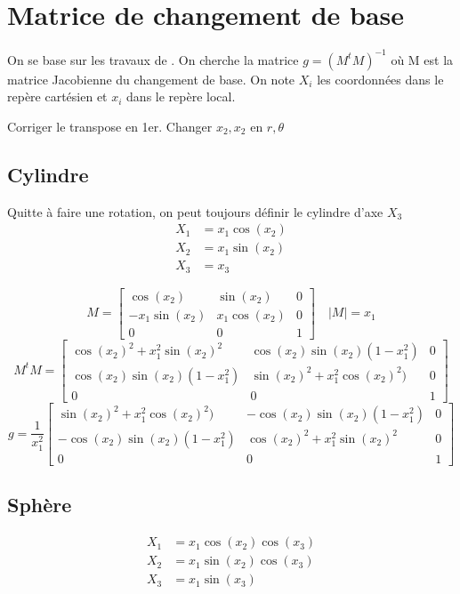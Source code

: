 \section{Matrice de changement de base}
On se base sur les travaux de \cite{lafitte_diffraction_1998}. On cherche la matrice \(g=\left(M^tM\right)^{-1}\) où M est la matrice Jacobienne du changement de base.
On note \(X_i\) les coordonnées dans le repère cartésien et \(x_i\) dans le repère local.

\begin{TODO}
  Corriger le transpose en 1er. Changer \(x_2,x_2\) en \(r,\theta\)
\end{TODO}

\subsection{Cylindre}
Quitte à faire une rotation, on peut toujours définir le cylindre d'axe \(X_3\)
\begin{align*}
X_1 &= x_1 \cos(x_2) \\
X_2 &= x_1 \sin(x_2) \\
X_3 &= x_3
\end{align*}

\[
M = \begin{bmatrix}
\cos(x_2) & \sin(x_2) & 0 \\
-x_1\sin(x_2) & x_1\cos(x_2) & 0 \\
0 & 0 & 1
\end{bmatrix} \quad |M| = x_1
\]
\[
M^tM =
\begin{bmatrix}
\cos(x_2)^2 + x_1^2 \sin(x_2)^2 & \cos(x_2)\sin(x_2)(1-x_1^2) & 0 \\
\cos(x_2)\sin(x_2)(1-x_1^2) & \sin(x_2)^2 + x_1^2\cos(x_2)^2) & 0 \\
0 & 0 & 1
\end{bmatrix}
\]
\[
g = \frac{1}{x_1^2}
\begin{bmatrix}
\sin(x_2)^2 + x_1^2\cos(x_2)^2) & -\cos(x_2)\sin(x_2)(1-x_1^2) & 0 \\
-\cos(x_2)\sin(x_2)(1-x_1^2) & \cos(x_2)^2 + x_1^2 \sin(x_2)^2& 0 \\
0 & 0 & 1
\end{bmatrix}
\]
\subsection{Sphère}
\begin{align*}
X_1 &= x_1 \cos(x_2)\cos(x_3) \\
X_2 &= x_1 \sin(x_2)\cos(x_3) \\
X_3 &= x_1 \sin(x_3)
\end{align*}

